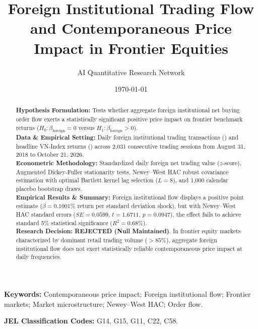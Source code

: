 \documentclass{article}
\title{\textbf{Foreign Institutional Trading Flow and Contemporaneous Price Impact in Frontier Equities}}
\author[1*]{AI Quantitative Research Network}
\affil[1]{Autonomous Financial Machine Learning \& Empirical Econometrics Lab, Ho Chi Minh City, Vietnam}
\affil[*]{Contact: \texttt{research@vnresearch.org}}
\date{\today}
\begin{document}
\maketitle

\begin{abstract}
\noindent \textbf{Hypothesis Formulation:} Tests whether aggregate foreign institutional net buying order flow exerts a statistically significant positive price impact on frontier benchmark returns ($H_0: \beta_{\text{foreign}} = 0$ versus $H_1: \beta_{\text{foreign}} > 0$). \\
\textbf{Data \& Empirical Setting:} Daily foreign institutional trading transactions () and headline VN-Index returns () across 2,031 consecutive trading sessions from August 31, 2018 to October 21, 2026. \\
\textbf{Econometric Methodology:} Standardized daily foreign net trading value ($z$-score), Augmented Dickey-Fuller stationarity tests, Newey--West HAC robust covariance estimation with optimal Bartlett kernel lag selection ($L = 8$), and 1,000 calendar placebo bootstrap draws. \\
\textbf{Empirical Results \& Summary:} Foreign institutional flow displays a positive point estimate ($\beta = 0.1001$\% return per standard deviation shock), but with Newey--West HAC standard errors ($SE = 0.0599$, $t = 1.6711$, $p = 0.0947$), the effect fails to achieve standard 5\% statistical significance ($R^2 = 0.68\%$). \\
\textbf{Research Decision:} \textbf{REJECTED (Null Maintained)}. In frontier equity markets characterized by dominant retail trading volume ($>85\%$), aggregate foreign institutional flow does not exert statistically reliable contemporaneous price impact at daily frequencies.
\end{abstract}

\vspace{0.5em}
\noindent \textbf{Keywords:} Contemporaneous price impact; Foreign institutional flow; Frontier markets; Market microstructure; Newey--West HAC; Order flow.

\vspace{0.5em}
\noindent \textbf{JEL Classification Codes:} G14, G15, G11, C22, C58.

\newpage

\end{document}
